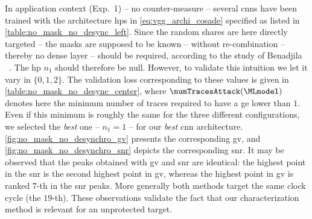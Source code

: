 In application context (Exp.~1) -- \ie{} no counter-measure -- several \glspl{cnn} have been trained with the architecture \glspl{hp} in \autoref{eq:vgg_archi_cosade} specified as listed in \autoref{table:no_mask_no_desync_left}. 
Since the random shares are here directly targeted -- \ie{} the masks are supposed to be known -- without re-combination -- thereby no dense layer -- should be required, according to the study of Benadjila \etal{}~\cite[Sec.~4.2.4]{prouff_study_2018}. 
The \gls{hp} \(n_1\) should therefore be null. 
However, to validate this intuition we let it vary in \(\{0,1,2\}\). 
The validation loss corresponding to these values is given in \autoref{table:no_mask_no_desync_center}, where \(\numTracesAttack(\MLmodel)\) denotes here the minimum number of traces required to have a \gls{ge} lower than \(1\).
Even if this minimum is roughly the same for the three different configurations, we selected the \emph{best} one 
-- \ie{} \(n_1=1\) -- for our \emph{best} \gls{cnn}  architecture. 
\autoref{fig:no_mask_no_desynchro_gv} presents the corresponding \gls{gv}, and \autoref{fig:no_mask_no_desynchro_snr} depicts the corresponding \gls{snr}.
It may be observed that the peaks obtained with \gls{gv} and \gls{snr} are identical: the highest point in the \gls{snr} is the second highest point in \gls{gv}, whereas the highest point in \gls{gv} is ranked \(7\)-th in the \gls{snr} peaks. 
More generally both methods target the same clock cycle (the \(19\)-th).
These observations validate the fact that our characterization method is relevant for an unprotected target.

